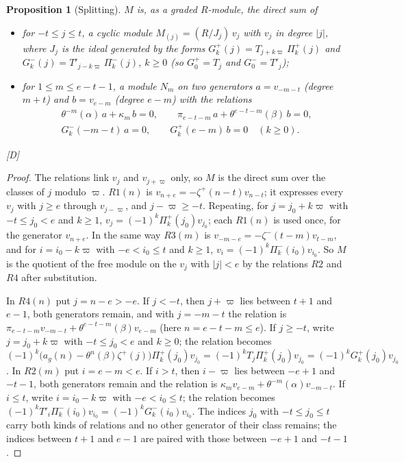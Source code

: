 \documentclass[11pt]{article}
\newtheorem{proposition}{Proposition}
\theoremstyle{definition}
\theoremstyle{remark}
\begin{document}
\begin{proposition}[Splitting]\label{prop:exptsplit}
$M$ is, as a graded $R$-module, the direct sum of
\begin{itemize}
\item for $-t\le j\le t$, a cyclic module $M_{(j)}=(R/J_j)\,v_j$ with $v_j$ in degree $|j|$, where $J_j$ is the ideal generated by the forms $G^+_k(j)=T_{j+k\varpi}\,\Pi^+_k(j)$ and $G^-_k(j)=T'_{j-k\varpi}\,\Pi^-_k(j)$, $k\ge0$ (so $G^+_0=T_j$ and $G^-_0=T'_j$);
\item for $1\le m\le e-t-1$, a module $N_m$ on two generators $a=v_{-m-t}$ (degree $m+t$) and $b=v_{e-m}$ (degree $e-m$) with the relations
\begin{gather*}
\theta^{-m}(\alpha)\,a+\kappa_m\,b=0,\qquad\pi_{e-t-m}\,a+\theta^{e-t-m}(\beta)\,b=0,\\
G^-_k(-m-t)\,a=0,\qquad G^+_k(e-m)\,b=0\quad(k\ge0).
\end{gather*}
\end{itemize}
[D]
\end{proposition}
\begin{proof}
The relations link $v_j$ and $v_{j+\varpi}$ only, so $M$ is the direct sum over the classes of $j$ modulo $\varpi$. $R1(n)$ is $v_{n+e}=-\zeta^+(n-t)v_{n-t}$; it expresses every $v_j$ with $j\ge e$ through $v_{j-\varpi}$, and $j-\varpi\ge-t$. Repeating, for $j=j_0+k\varpi$ with $-t\le j_0<e$ and $k\ge1$, $v_j=(-1)^k\Pi^+_k(j_0)v_{j_0}$; each $R1(n)$ is used once, for the generator $v_{n+e}$. In the same way $R3(m)$ is $v_{-m-e}=-\zeta^-(t-m)v_{t-m}$, and for $i=i_0-k\varpi$ with $-e<i_0\le t$ and $k\ge1$, $v_i=(-1)^k\Pi^-_k(i_0)v_{i_0}$. So $M$ is the quotient of the free module on the $v_j$ with $|j|<e$ by the relations $R2$ and $R4$ after substitution.

In $R4(n)$ put $j=n-e>-e$. If $j<-t$, then $j+\varpi$ lies between $t+1$ and $e-1$, both generators remain, and with $j=-m-t$ the relation is $\pi_{e-t-m}v_{-m-t}+\theta^{e-t-m}(\beta)v_{e-m}$ (here $n=e-t-m\le e$). If $j\ge-t$, write $j=j_0+k\varpi$ with $-t\le j_0<e$ and $k\ge0$; the relation becomes $(-1)^k\bigl(a_g(n)-\theta^n(\beta)\zeta^+(j)\bigr)\Pi^+_k(j_0)v_{j_0}=(-1)^kT_j\Pi^+_k(j_0)v_{j_0}=(-1)^kG^+_k(j_0)v_{j_0}$. In $R2(m)$ put $i=e-m<e$. If $i>t$, then $i-\varpi$ lies between $-e+1$ and $-t-1$, both generators remain and the relation is $\kappa_mv_{e-m}+\theta^{-m}(\alpha)v_{-m-t}$. If $i\le t$, write $i=i_0-k\varpi$ with $-e<i_0\le t$; the relation becomes $(-1)^kT'_i\Pi^-_k(i_0)v_{i_0}=(-1)^kG^-_k(i_0)v_{i_0}$. The indices $j_0$ with $-t\le j_0\le t$ carry both kinds of relations and no other generator of their class remains; the indices between $t+1$ and $e-1$ are paired with those between $-e+1$ and $-t-1$.
\end{proof}
\end{document}
